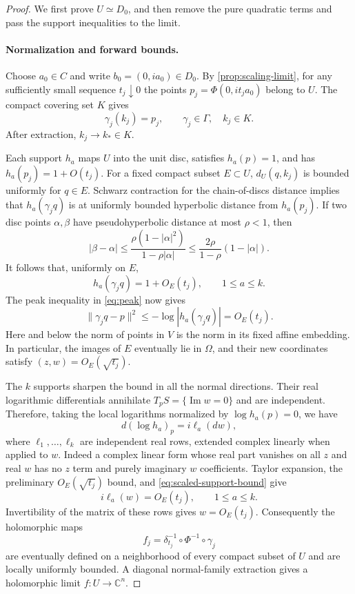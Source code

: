 \begin{proof}
We first prove $U\simeq D_0$, and then remove the pure quadratic terms and pass the support inequalities to the limit.

\paragraph{Normalization and forward bounds.}
Choose $a_0\in C$ and write $b_0=(0,ia_0)\in D_0$.  By \cref{prop:scaling-limit}, for any sufficiently small sequence $t_j\downarrow0$ the points $p_j=\Phi(0,it_ja_0)$ belong to $U$.  The compact covering set $K$ gives
\[
 \gamma_j(k_j)=p_j,\qquad \gamma_j\in\Gamma,\quad k_j\in K.
\]
After extraction, $k_j\to k_*\in K$.

Each support $h_a$ maps $U$ into the unit disc, satisfies $h_a(p)=1$, and has $h_a(p_j)=1+O(t_j)$.  For a fixed compact subset $E\subset U$, $d_U(q,k_j)$ is bounded uniformly for $q\in E$.  Schwarz contraction for the chain-of-discs distance implies that $h_a(\gamma_jq)$ is at uniformly bounded hyperbolic distance from $h_a(p_j)$.  If two disc points $\alpha,\beta$ have pseudohyperbolic distance at most $\rho<1$, then
\[
 |\beta-\alpha|
 \le \frac{\rho(1-|\alpha|^2)}{1-\rho|\alpha|}
 \le \frac{2\rho}{1-\rho}(1-|\alpha|).
\]
It follows that, uniformly on $E$,
\begin{equation}
\label{eq:scaled-support-bound}
 h_a(\gamma_jq)=1+O_E(t_j),\qquad 1\le a\le k.
\end{equation}
The peak inequality in \eqref{eq:peak} now gives
\[
 \lVert\gamma_jq-p\rVert^2
 \le -\log|h_a(\gamma_jq)|=O_E(t_j).
\]
Here and below the norm of points in $V$ is the norm in its fixed affine embedding.  In particular, the images of $E$ eventually lie in $\Omega$, and their new coordinates satisfy $(z,w)=O_E(\sqrt{t_j})$.

The $k$ supports sharpen the bound in all the normal directions. Their real logarithmic differentials annihilate $T_pS=\{\operatorname{Im}w=0\}$ and are independent.  Therefore, taking the local logarithms normalized by $\log h_a(p)=0$, we have
\begin{equation}
\label{eq:normal-linear-supports}
 d(\log h_a)_p=i\ell_a(dw),
\end{equation}
where $\ell_1,\ldots,\ell_k$ are independent real rows, extended complex linearly when applied to $w$.  Indeed a complex linear form whose real part vanishes on all $z$ and real $w$ has no $z$ term and purely imaginary $w$ coefficients.  Taylor expansion, the preliminary $O_E(\sqrt{t_j})$ bound, and \eqref{eq:scaled-support-bound} give
\[
 i\ell_a(w)=O_E(t_j),\qquad 1\le a\le k.
\]
Invertibility of the matrix of these rows gives $w=O_E(t_j)$. Consequently the holomorphic maps
\[
 f_j=\delta_{t_j}^{-1}\circ\Phi^{-1}\circ\gamma_j
\]
are eventually defined on a neighborhood of every compact subset of $U$ and are locally uniformly bounded.  A diagonal normal-family extraction gives a holomorphic limit $f:U\to\mathbb{C}^n$.


\end{proof}
